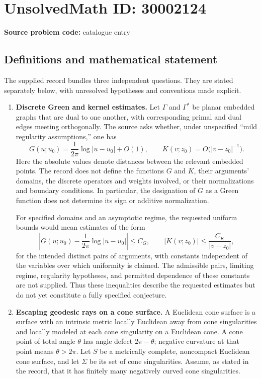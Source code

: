 \documentclass[11pt]{article}
\begin{document}
\section*{UnsolvedMath ID: 30002124}
\textbf{Source problem code:} catalogue entry
\subsection{Definitions and mathematical statement}
The supplied record bundles three independent questions. They are stated separately below, with unresolved hypotheses and conventions made explicit.

\begin{enumerate}
\item \textbf{Discrete Green and kernel estimates.} Let \(\Gamma\) and \(\Gamma^*\) be planar embedded graphs that are dual to one another, with corresponding primal and dual edges meeting orthogonally. The source asks whether, under unspecified ``mild regularity assumptions,'' one has
\[
G(u;u_0)=\frac{1}{2\pi}\log|u-u_0|+O(1),
\qquad
K(v;z_0)=O\bigl(|v-z_0|^{-1}\bigr).
\]
Here the absolute values denote distances between the relevant embedded points. The record does not define the functions \(G\) and \(K\), their arguments' domains, the discrete operators and weights involved, or their normalizations and boundary conditions. In particular, the designation of \(G\) as a Green function does not determine its sign or additive normalization.

For specified domains and an asymptotic regime, the requested uniform bounds would mean estimates of the form
\[
\left|G(u;u_0)-\frac{1}{2\pi}\log|u-u_0|\right|\leq C_G,
\qquad
|K(v;z_0)|\leq\frac{C_K}{|v-z_0|},
\]
for the intended distinct pairs of arguments, with constants independent of the variables over which uniformity is claimed. The admissible pairs, limiting regime, regularity hypotheses, and permitted dependence of these constants are not supplied. Thus these inequalities describe the requested estimates but do not yet constitute a fully specified conjecture.

\item \textbf{Escaping geodesic rays on a cone surface.} A Euclidean cone surface is a surface with an intrinsic metric locally Euclidean away from cone singularities and locally modeled at each cone singularity on a Euclidean cone. A cone point of total angle \(\theta\) has angle defect \(2\pi-\theta\); negative curvature at that point means \(\theta>2\pi\). Let \(S\) be a metrically complete, noncompact Euclidean cone surface, and let \(\Sigma\) be its set of cone singularities. Assume, as stated in the record, that it has finitely many negatively curved cone singularities.


\end{enumerate}
\end{document}
